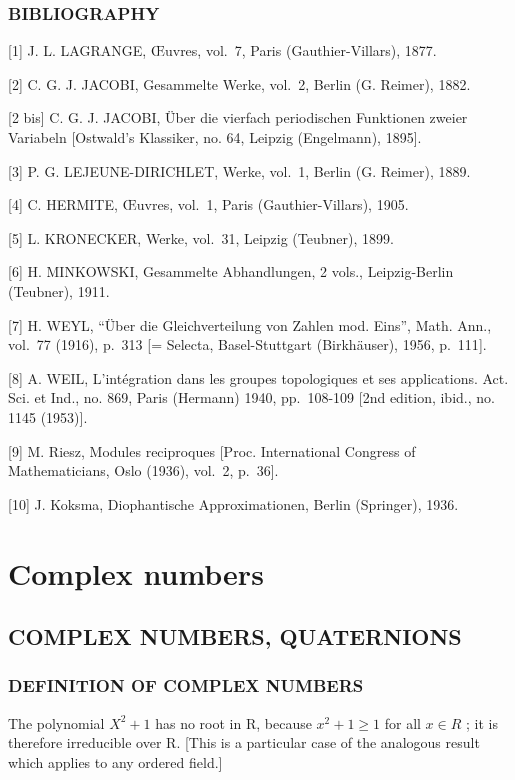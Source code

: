 \subsection*{BIBLIOGRAPHY}

{[}1{]} J. L. LAGRANGE, Œuvres, vol.~7, Paris (Gauthier-Villars), 1877.

{[}2{]} C. G. J. JACOBI, Gesammelte Werke, vol.~2, Berlin (G. Reimer), 1882.

{[}2 bis{]} C. G. J. JACOBI, Über die vierfach periodischen Funktionen zweier Variabeln {[}Ostwald's Klassiker, no. 64, Leipzig (Engelmann), 1895{]}.

{[}3{]} P. G. LEJEUNE-DIRICHLET, Werke, vol.~1, Berlin (G. Reimer), 1889.

{[}4{]} C. HERMITE, Œuvres, vol.~1, Paris (Gauthier-Villars), 1905.

{[}5{]} L. KRONECKER, Werke, vol.~31, Leipzig (Teubner), 1899.

{[}6{]} H. MINKOWSKI, Gesammelte Abhandlungen, 2 vols., Leipzig-Berlin (Teubner), 1911.

{[}7{]} H. WEYL, ``Über die Gleichverteilung von Zahlen mod. Eins'', Math. Ann., vol.~77 (1916), p.~313 {[}= Selecta, Basel-Stuttgart (Birkhäuser), 1956, p.~111{]}.

{[}8{]} A. WEIL, L'intégration dans les groupes topologiques et ses applications. Act. Sci. et Ind., no. 869, Paris (Hermann) 1940, pp.~108-109 {[}2nd edition, ibid., no. 1145 (1953){]}.

{[}9{]} M. Riesz, Modules reciproques {[}Proc. International Congress of Mathematicians, Oslo (1936), vol.~2, p.~36{]}.

{[}10{]} J. Koksma, Diophantische Approximationen, Berlin (Springer), 1936.

\chapter{Complex numbers}

\section{COMPLEX NUMBERS, QUATERNIONS}

\subsection{DEFINITION OF COMPLEX NUMBERS}

The polynomial \(X^{2} + 1\) has no root in R, because \(x^{2} + 1 \geqslant 1\) for all \(x \in R\) ; it is therefore irreducible over R. {[}This is a particular case of the analogous result which applies to any ordered field.{]}

